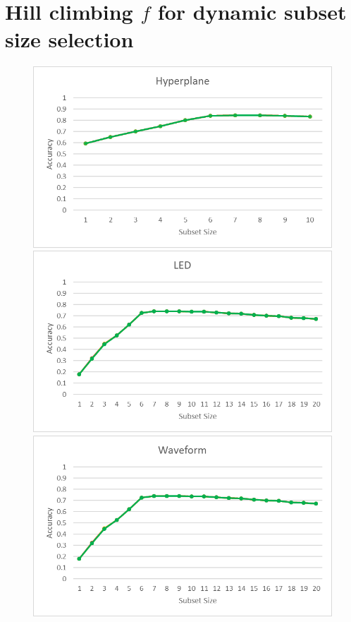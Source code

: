\section{Hill climbing $f$ for dynamic subset size selection}

\begin{figure}[h]
\begin{center}
\includegraphics[scale=0.25]{Graphs/AccuracyDifference/Hyperplane}
\includegraphics[scale=0.25]{Graphs/AccuracyDifference/LED20}
\includegraphics[scale=0.25]{Graphs/AccuracyDifference/Waveform}

\end{center}
\end{figure}
